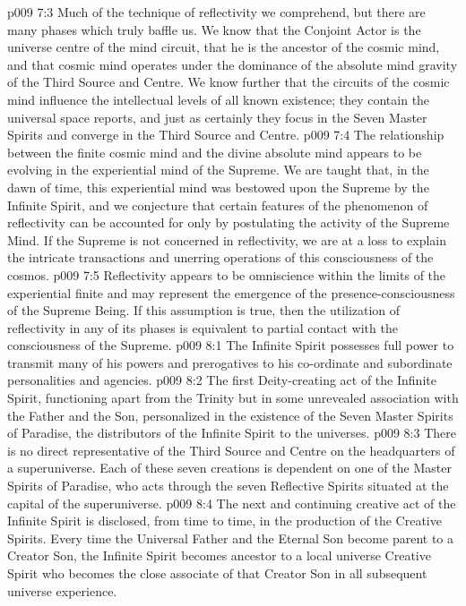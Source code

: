\vs p009 7:3 Much of the technique of reflectivity we comprehend, but there are many phases which truly baffle us. We know that the Conjoint Actor is the universe centre of the mind circuit, that he is the ancestor of the cosmic mind, and that cosmic mind operates under the dominance of the absolute mind gravity of the Third Source and Centre. We know further that the circuits of the cosmic mind influence the intellectual levels of all known existence; they contain the universal space reports, and just as certainly they focus in the Seven Master Spirits and converge in the Third Source and Centre.
\vs p009 7:4 \pc The relationship between the finite cosmic mind and the divine absolute mind appears to be evolving in the experiential mind of the Supreme. We are taught that, in the dawn of time, this experiential mind was bestowed upon the Supreme by the Infinite Spirit, and we conjecture that certain features of the phenomenon of reflectivity can be accounted for only by postulating the activity of the Supreme Mind. If the Supreme is not concerned in reflectivity, we are at a loss to explain the intricate transactions and unerring operations of this consciousness of the cosmos.
\vs p009 7:5 Reflectivity appears to be omniscience within the limits of the experiential finite and may represent the emergence of the presence\hyp{}consciousness of the Supreme Being. If this assumption is true, then the utilization of reflectivity in any of its phases is equivalent to partial contact with the consciousness of the Supreme.
\vs p009 8:1 The Infinite Spirit possesses full power to transmit many of his powers and prerogatives to his co\hyp{}ordinate and subordinate personalities and agencies.
\vs p009 8:2 The first Deity\hyp{}creating act of the Infinite Spirit, functioning apart from the Trinity but in some unrevealed association with the Father and the Son, personalized in the existence of the Seven Master Spirits of Paradise, the distributors of the Infinite Spirit to the universes.
\vs p009 8:3 There is no direct representative of the Third Source and Centre on the headquarters of a superuniverse. Each of these seven creations is dependent on one of the Master Spirits of Paradise, who acts through the seven Reflective Spirits situated at the capital of the superuniverse.
\vs p009 8:4 The next and continuing creative act of the Infinite Spirit is disclosed, from time to time, in the production of the Creative Spirits. Every time the Universal Father and the Eternal Son become parent to a Creator Son, the Infinite Spirit becomes ancestor to a local universe Creative Spirit who becomes the close associate of that Creator Son in all subsequent universe experience.
